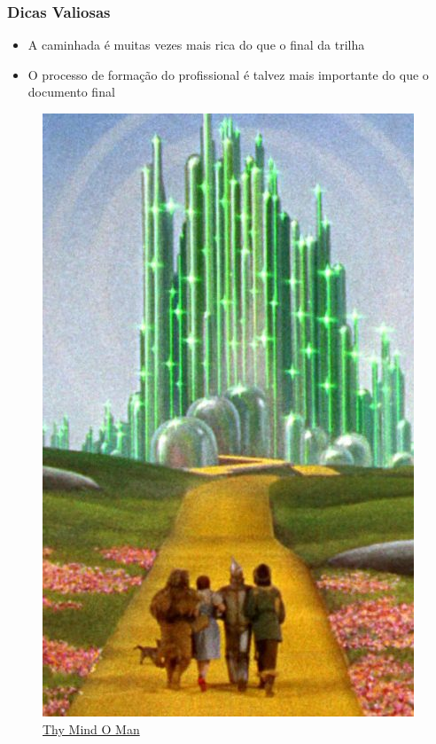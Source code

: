 \begin{frame}
    \frametitle{Dicas Valiosas}
        \begin{itemize}
            \item A caminhada é muitas vezes mais rica do que o final da trilha
            \item O processo de formação do profissional é talvez mais importante do que o documento final
        \end{itemize}
        \begin{figure}
            \centering
            \includegraphics[width=0.3\linewidth]{figs/magicodeoz.jpg}
            \caption{\href{https://www.thymindoman.com/the-mysticism-of-the-wizard-of-oz-our-journey-home/}{Thy Mind O Man}}
        \end{figure}
\end{frame}